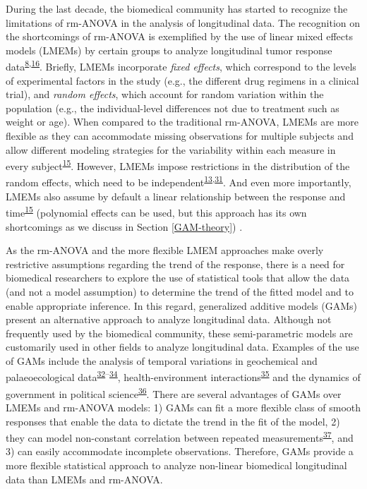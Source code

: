 \documentclass[
]{article}
\begin{document}
During the last decade, the biomedical community has started to recognize the limitations of rm-ANOVA in the analysis of longitudinal data. The recognition on the shortcomings of rm-ANOVA is exemplified by the use of linear mixed effects models (LMEMs) by certain groups to analyze longitudinal tumor response data\textsuperscript{\protect\hyperlink{ref-skala2010}{8},\protect\hyperlink{ref-vishwanath2009}{16}}. Briefly, LMEMs incorporate \emph{fixed effects}, which correspond to the levels of experimental factors in the study (e.g., the different drug regimens in a clinical trial), and \emph{random effects}, which account for random variation within the population (e.g., the individual-level differences not due to treatment such as weight or age). When compared to the traditional rm-ANOVA, LMEMs are more flexible as they can accommodate missing observations for multiple subjects and allow different modeling strategies for the variability within each measure in every subject\textsuperscript{\protect\hyperlink{ref-pinheiro2006}{15}}. However, LMEMs impose restrictions in the distribution of the random effects, which need to be independent\textsuperscript{\protect\hyperlink{ref-gueorguieva2004}{13},\protect\hyperlink{ref-barr2013}{31}}. And even more importantly, LMEMs also assume by default a linear relationship between the response and time\textsuperscript{\protect\hyperlink{ref-pinheiro2006}{15}} (polynomial effects can be used, but this approach has its own shortcomings as we discuss in Section \ref{GAM-theory}) .

As the rm-ANOVA and the more flexible LMEM approaches make overly restrictive assumptions regarding the trend of the response, there is a need for biomedical researchers to explore the use of statistical tools that allow the data (and not a model assumption) to determine the trend of the fitted model and to enable appropriate inference. In this regard, generalized additive models (GAMs) present an alternative approach to analyze longitudinal data. Although not frequently used by the biomedical community, these semi-parametric models are customarily used in other fields to analyze longitudinal data. Examples of the use of GAMs include the analysis of temporal variations in geochemical and palaeoecological data\textsuperscript{\protect\hyperlink{ref-rose2012}{32}--\protect\hyperlink{ref-simpson2018}{34}}, health-environment interactions\textsuperscript{\protect\hyperlink{ref-yang2012}{35}} and the dynamics of government in political science\textsuperscript{\protect\hyperlink{ref-beck1998}{36}}. There are several advantages of GAMs over LMEMs and rm-ANOVA models: 1) GAMs can fit a more flexible class of smooth responses that enable the data to dictate the trend in the fit of the model, 2) they can model non-constant correlation between repeated measurements\textsuperscript{\protect\hyperlink{ref-wood2017}{37}}, and 3) can easily accommodate incomplete observations. Therefore, GAMs provide a more flexible statistical approach to analyze non-linear biomedical longitudinal data than LMEMs and rm-ANOVA.
\end{document}
